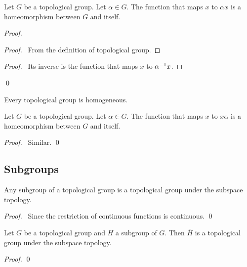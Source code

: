 \begin{prop}
Let $G$ be a topological group. Let $\alpha \in G$. The function that maps $x$ to $\alpha x$ is a homeomorphism between $G$ and itself.
\end{prop}

\begin{proof}
\pf
{}
\begin{proof}
	\pf\ From the definition of topological group.
\end{proof}
\begin{proof}
	\pf\ Its inverse is the function that maps $x$ to ${\alpha}^{-1} x$.
\end{proof}
\qed
\end{proof}

\begin{cor}
Every topological group is homogeneous.
\end{cor}

\begin{prop}
Let $G$ be a topological group. Let $\alpha \in G$. The function that maps $x$ to $x \alpha$ is a homeomorphism between $G$ and itself.
\end{prop}

\begin{proof}
\pf\ Similar. \qed
\end{proof}

\subsection{Subgroups}

\begin{prop}
Any subgroup of a topological group is a topological group under the subspace topology.
\end{prop}

\begin{proof}
\pf\ Since the restriction of continuous functions is continuous. \qed
\end{proof}

\begin{prop}
Let $G$ be a topological group and $H$ a subgroup of $G$. Then $\overline{H}$ is a topological group under the subspace topology.
\end{prop}

\begin{proof}
\pf
{}
\qed
\end{proof}

